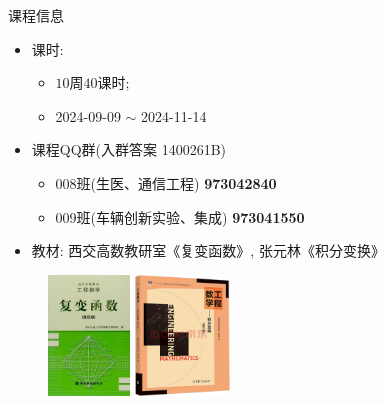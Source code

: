 \begin{frame}[<*>]{课程信息}
	\begin{itemize}
		\item 课时:
			\begin{itemize}
				\item $10$周$40$课时;
				\item 2024-09-09 $\sim$ 2024-11-14
			\end{itemize}
		\item 课程QQ群(入群答案 1400261B)
			\begin{itemize}
				\item 008班(生医、通信工程) \alert{\textbf{973042840}}
				\item 009班(车辆创新实验、集成) \alert{\textbf{973041550}}
			\end{itemize}
		\item 教材: 西交高数教研室《复变函数》, 张元林《积分变换》
	\end{itemize}
	\begin{center}
		\begin{figure}
			\includegraphics[height=32mm]{../image/book1.jpg}
			\includegraphics[height=32mm]{../image/book2.png}
		\end{figure}
	\end{center}
\end{frame}


